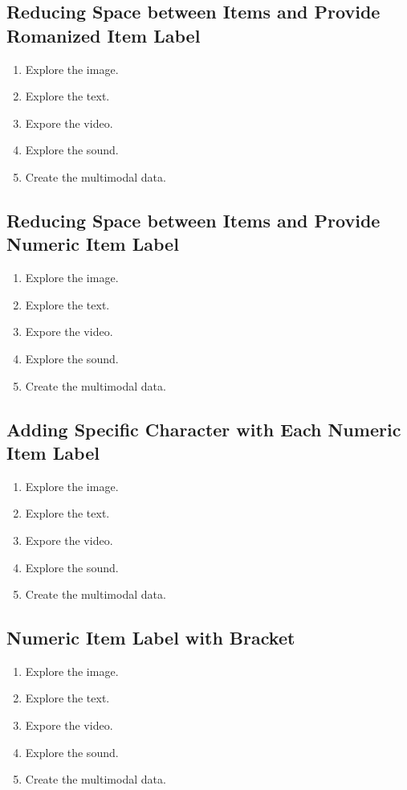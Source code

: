 \documentclass[11pt]{article}
\begin{document}
{\subsection{Reducing Space between Items and Provide Romanized Item Label}
\begin{enumerate}[nosep, label=\roman*]
\item Explore the image.
\item Explore the text.
\item Expore the video.
\item Explore the sound.
\item Create the multimodal data.
\end{enumerate}


\subsection{Reducing Space between Items and Provide Numeric Item Label}
\begin{enumerate}[nosep, label=\arabic*]
\item Explore the image.
\item Explore the text.
\item Expore the video.
\item Explore the sound.
\item Create the multimodal data.
\end{enumerate}


\subsection{Adding Specific Character with Each Numeric Item Label}
\begin{enumerate}[nosep, label=B\arabic*]
\item Explore the image.
\item Explore the text.
\item Expore the video.
\item Explore the sound.
\item Create the multimodal data.
\end{enumerate}


\subsection{Numeric Item Label with Bracket}
\begin{enumerate}[nosep, label=(\arabic*)]
\item Explore the image.
\item Explore the text.
\item Expore the video.
\item Explore the sound.
\item Create the multimodal data.
\end{enumerate}


}
\end{document}
